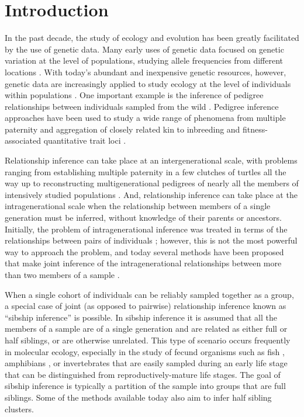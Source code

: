 
\section*{Introduction}

In the past decade, the study of ecology and evolution has been greatly facilitated by the use of genetic 
data.  Many early uses of genetic data focused on genetic variation at the level of populations, 
studying allele frequencies from different locations \citep{neigel97}. With today's abundant and 
inexpensive genetic resources, however, genetic data are increasingly applied to study ecology at the 
level of individuals within populations \citep{Pea&Cra2004,Maneletal2005}. One important example is the 
inference of pedigree relationships between individuals sampled from the wild 
\citep{blouin03,Pemberton2008}. Pedigree inference approaches have been used to study a wide range of 
phenomena from multiple paternity \citep{Sogardetal2005} and aggregation of closely related kin 
\citep{Fraseretal2005}  to inbreeding \citep{Marshalletal2002} and fitness-associated quantitative 
trait loci \citep{beraldi07}. 

Relationship inference can take place at an intergenerational scale, with problems ranging from 
establishing multiple paternity in a few clutches of turtles \citep{Pea&Avi2001} all the way up to 
reconstructing multigenerational pedigrees of nearly all the members of intensively studied populations 
\citep{Robinsonetal2006,Dunnetal2011}.  And, relationship inference can take place at the intragenerational scale when the relationship between members of a single generation must be inferred, 
without knowledge of their parents or ancestors.  Initially, the problem of intragenerational inference 
was treated in terms of the relationships between pairs of individuals \citep{Thompson1975}; 
however, this is not the most powerful way to approach the problem, and today several methods have been 
proposed that make joint inference of the intragenerational relationships between more than two members 
of a sample \citep{painter97,almudevar99,Siebertsetal02,Wang2007_triadic}.  

When a single cohort of individuals can be reliably sampled together as a group, a special case of 
joint (as opposed to pairwise) relationship inference known as ``sibship inference'' is possible.  In 
sibship inference it is assumed that all the members of a sample are of a single generation and are 
related as either full or half siblings, or are otherwise unrelated. This type of scenario occurs 
frequently in molecular ecology, especially in the study of fecund organisms such as fish 
\citep{And&Dun2008,Garzaetal_norcal}, amphibians \citep{Halversonetal2006}, or invertebrates \citep{read12} that are 
easily sampled during an early life stage that can be distinguished from reproductively-mature life 
stages.  The goal of sibship inference is typically a partition of the sample into groups that are full 
siblings. Some of the methods available today also aim to infer half sibling clusters.  

